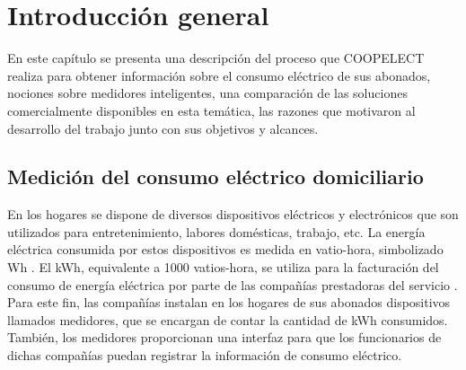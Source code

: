 
\chapter{Introducción general} %

\label{Chapter1} %
\label{IntroGeneral}


\newcommand{\keyword}[1]{\textbf{#1}}
\newcommand{\tabhead}[1]{\textbf{#1}}
\newcommand{\code}[1]{\texttt{#1}}
\newcommand{\file}[1]{\texttt{\bfseries#1}}
\newcommand{\option}[1]{\texttt{\itshape#1}}
\newcommand{\grados}{$^{\circ}$}



En este capítulo se presenta una descripción del proceso que COOPELECT realiza para obtener información sobre el consumo eléctrico de sus abonados, nociones sobre medidores inteligentes, una comparación de las soluciones comercialmente disponibles en esta temática, las razones que motivaron al desarrollo del trabajo junto con sus objetivos y alcances.


\section{Medición del consumo eléctrico domiciliario}

En los hogares se dispone de diversos dispositivos eléctricos y electrónicos que son utilizados para entretenimiento, labores domésticas, trabajo, etc. La energía eléctrica consumida por estos dispositivos es medida en vatio-hora, simbolizado Wh \citep{WEBSITE:1}. El kWh, equivalente a 1000 vatios-hora, se utiliza para la facturación del consumo de energía eléctrica por parte de las compañías prestadoras del servicio \citep{WEBSITE:1}. Para este fin, las compañías instalan en los hogares de sus abonados dispositivos llamados medidores, que se encargan de contar la cantidad de kWh consumidos. También, los medidores proporcionan una interfaz para que los funcionarios de dichas compañías puedan registrar la información de consumo eléctrico.

